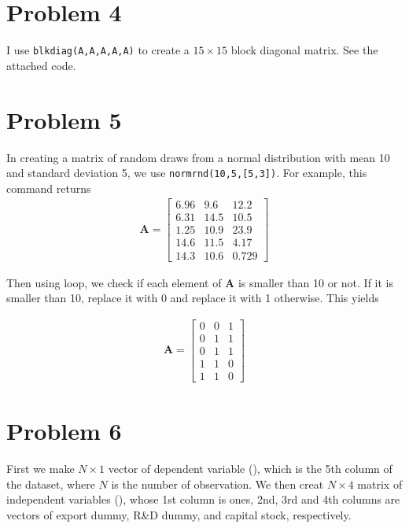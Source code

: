 \documentclass[11pt,letter]{article}
\newcommand{\vect}[1]{\boldsymbol{\mathbf{#1}}}
\newcounter{lem}[section] \setcounter{lem}{0}
\newcommand{\code}[1]{\texttt{#1}}
\begin{document}
\section*{Problem 4}
I use \code{blkdiag(A,A,A,A,A)} to create a $15\times15$ block diagonal matrix. See the attached code.

\section*{Problem 5}

In creating a matrix of random draws from a normal distribution with mean 10 and standard deviation 5, we use \code{normrnd(10,5,[5,3])}. For example, this command returns
\begin{align*}
\vect{A} = \left[\begin{array}{rrr} 6.96 & 9.6 & 12.2\\ 6.31 & 14.5 & 10.5\\ 1.25 & 10.9 & 23.9\\ 14.6 & 11.5 & 4.17\\ 14.3 & 10.6 & 0.729 \end{array}\right]
\end{align*}

Then using loop, we check if each element of $\vect{A}$ is smaller than 10 or not. If it is smaller than 10, replace it with 0 and replace it with 1 otherwise. This yields

\begin{align*}
\vect{A} = \left[\begin{array}{rrr} 0 & 0 & 1\\ 0 & 1 & 1\\ 0 & 1 & 1\\ 1 & 1 & 0\\ 1 & 1 & 0 \end{array}\right]
\end{align*}

\section*{Problem 6}

First we make $N\times 1$ vector of dependent variable (\vect{Y}), which is the 5th column of the dataset, where $N$ is the number of observation. We then creat $N\times 4$ matrix of independent variables (\vect{X}),  whose 1st column is ones, 2nd, 3rd and 4th columns are vectors of export dummy, R\&D dummy, and capital stock, respectively. 
\end{document}
